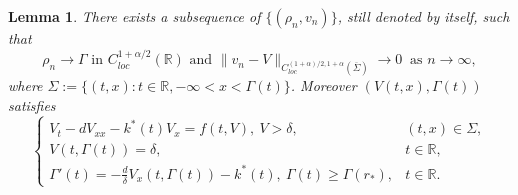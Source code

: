 \documentclass[11pt]{amsart}
\newtheorem{lemma}[theorem]{Lemma}
\numberwithin{equation}{section}
\begin{document}
\begin{lemma}\label{lem-lim}
  There exists a subsequence of $\{(\rho_n, v_n)\}$, still denoted by  itself, such that
  \begin{equation*}
    \rho_n\to \Gamma \text{ in } C^{1+\alpha/2}_{loc}(\mathbb{R}) \text{  and }\|v_n-V\|_{C_{loc}^{(1+\alpha)/2,1+\alpha}(\overline\Sigma)}\to 0 ~\text{ as } n\to \infty,
  \end{equation*}
  where $\Sigma:=\{(t,x):t\in\mathbb{R}, -\infty<x< \Gamma(t)\}$. Moreover $(V(t,x),\Gamma(t))$ satisfies
  \begin{equation}\label{eq-V}
    \begin{cases}
      V_t-dV_{xx}-k^*(t)V_x=f(t,V), ~V>\delta, &(t,x)\in\Sigma,\\
      V(t,\Gamma(t))=\delta, &t\in\mathbb{R},\\
      \Gamma'(t)=-\frac{d}{\delta}V_x(t,\Gamma(t))-k^*(t),~ \Gamma(t)\geq \Gamma(r_*), &t\in\mathbb R.
    \end{cases}
  \end{equation}
\end{lemma}
\end{document}

